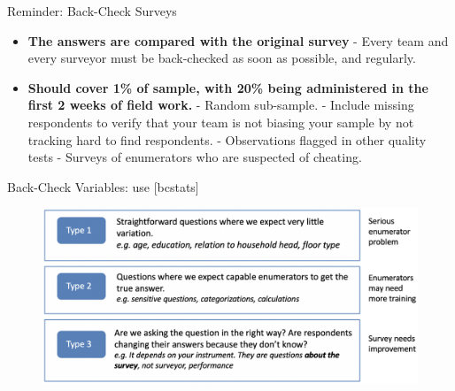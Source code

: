 \documentclass[aspectratio=169]{beamer}
\begin{document}
\begin{frame}[fragile]{Reminder: Back-Check Surveys}
	
	\begin{itemize}[<default overlay specification>]
		\item<1> \textbf{ The answers are compared with the original survey}
			\newline - Every team and every surveyor must be back-checked as soon as possible, and regularly.
		\item<1> \textbf{ Should cover 1\% of sample, with 20\% being administered in the first 2 weeks of field work.}
			\newline - Random sub-sample. 
			\newline - Include missing respondents to verify that your team is not biasing your sample by not tracking hard to find respondents. 
			\newline - Observations flagged in other quality tests
		\leavevmode 	\newline - Surveys of enumerators who are suspected of cheating.
	\end{itemize}
	
\end{frame}


\begin{frame}{Back-Check Variables: use [bcstats]}

\begin{figure}
	\centering
	\includegraphics[width=\linewidth]{img/Backcheck}
\end{figure}

\end{frame}
\end{document}
